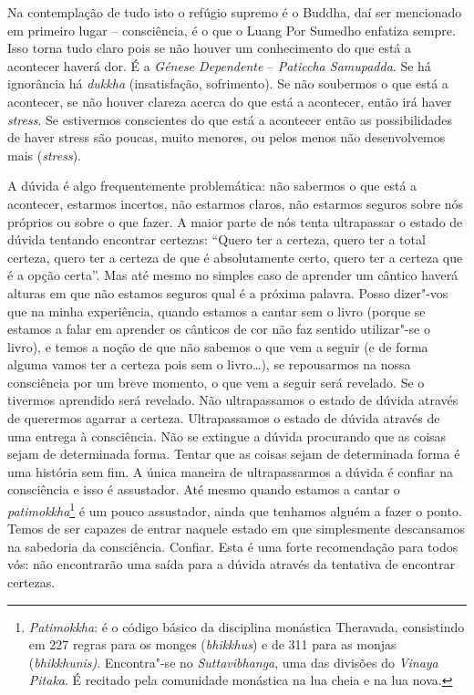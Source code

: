 Na contemplação de tudo isto o refúgio supremo é o Buddha, daí ser
mencionado em primeiro lugar -- consciência, é o que o Luang Por Sumedho
enfatiza sempre. Isso torna tudo claro pois se não houver um
conhecimento do que está a acontecer haverá dor. É a \emph{Génese
Dependente} -- \emph{Paticcha Samupadda}. Se há ignorância há
\emph{dukkha} (insatisfação, sofrimento). Se não soubermos o que está a
acontecer, se não houver clareza acerca do que está a acontecer, então
irá haver \emph{stress}. Se estivermos conscientes do que está a
acontecer então as possibilidades de haver stress são poucas, muito
menores, ou pelos menos não desenvolvemos mais (\emph{stress}).

A dúvida é algo frequentemente problemática: não sabermos o que está a
acontecer, estarmos incertos, não estarmos claros, não estarmos seguros
sobre nós próprios ou sobre o que fazer. A maior parte de nós tenta
ultrapassar o estado de dúvida tentando encontrar certezas: ``Quero ter
a certeza, quero ter a total certeza, quero ter a certeza de que é
absolutamente certo, quero ter a certeza que é a opção certa''. Mas até
mesmo no simples caso de aprender um cântico haverá alturas em que não
estamos seguros qual é a próxima palavra. Posso dizer"-vos que na minha
experiência, quando estamos a cantar sem o livro (porque se estamos a
falar em aprender os cânticos de cor não faz sentido utilizar"-se o
livro), e temos a noção de que não sabemos o que vem a seguir (e de
forma alguma vamos ter a certeza pois sem o livro\ldots{}), se
repousarmos na nossa consciência por um breve momento, o que vem a
seguir será revelado. Se o tivermos aprendido será revelado. Não
ultrapassamos o estado de dúvida através de querermos agarrar a certeza.
Ultrapassamos o estado de dúvida através de uma entrega à consciência.
Não se extingue a dúvida procurando que as coisas sejam de determinada
forma. Tentar que as coisas sejam de determinada forma é uma história
sem fim. A única maneira de ultrapassarmos a dúvida é confiar na
consciência e isso é assustador. Até mesmo quando estamos a cantar o
\emph{patimokkha}\footnote{%
  \emph{Patimokkha}: é o código básico da disciplina monástica
  Theravada, consistindo em 227 regras para os monges (\emph{bhikkhus}) e
  de 311 para as monjas (\emph{bhikkhunis)}. Encontra"-se no
  \emph{Suttavibhanga}, uma das divisões do \emph{Vinaya Pitaka}. É
  recitado pela comunidade monástica na lua cheia e na lua nova.
}
é um pouco assustador, ainda que tenhamos alguém a
fazer o ponto. Temos de ser capazes de entrar naquele estado em que
simplesmente descansamos na sabedoria da consciência. Confiar. Esta é
uma forte recomendação para todos vós: não encontrarão uma saída para a
dúvida através da tentativa de encontrar certezas.

